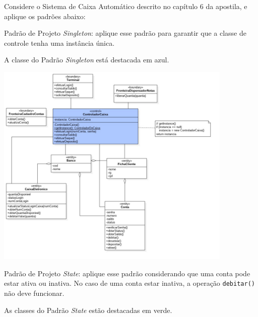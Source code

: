 \documentclass[12pt]{exam}
\begin{document}
    Considere o Sistema de Caixa Automático descrito no capítulo 6 da apostila, e aplique os
    padrões abaixo:
    
    \begin{questions}
	
      \question Padrão de Projeto \textit{Singleton}: aplique esse padrão para garantir que a classe de controle
      tenha uma instância única.  
      \begin{solution}
        A classe do Padrão \textit{Singleton} está destacada em azul.
        
        \includegraphics[width=0.85\textwidth]{imagens/lista2e1.jpg}
      \end{solution}
\pagebreak
      \question Padrão de Projeto \textit{State}: aplique esse padrão considerando que uma conta pode estar ativa
      ou inativa. No caso de uma conta estar inativa, a operação \verb!debitar()! não deve funcionar.
      \begin{solution}
         As classes do Padrão \textit{State} estão destacadas em verde.
         

\end{solution}
\end{questions}
\end{document}
